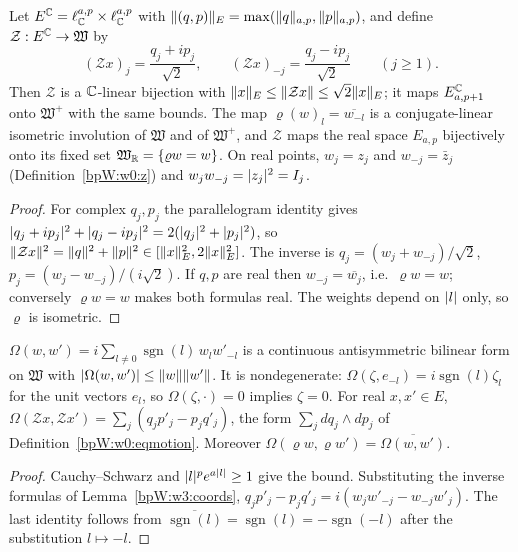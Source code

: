\begin{lemma}\label{bpW:w3:coords}
Let $E^{\mathbb{C}}=\ell^{a,p}_{\mathbb{C}}\times\ell^{a,p}_{\mathbb{C}}$ with $\lVert (q,p)\rVert_E=\max(\lVert q\rVert_{a,p},\lVert p\rVert_{a,p})$, and define
$\mathcal Z:E^{\mathbb{C}}\to\mathfrak W$ by
\[(\mathcal Zx)_j=\frac{q_j+ip_j}{\sqrt2},\qquad(\mathcal Zx)_{-j}=\frac{q_j-ip_j}{\sqrt2}\qquad(j\ge1).\]
Then $\mathcal Z$ is a $\mathbb{C}$-linear bijection with $\lVert x\rVert_E\le\lVert \mathcal Zx\rVert\le\sqrt2\lVert x\rVert_E$; it maps
$E^{\mathbb{C}}_{a,p+1}$ onto $\mathfrak W^+$ with the same bounds. The map $\varrho(w)_l=\overline{w_{-l}}$ is a
conjugate-linear isometric involution of $\mathfrak W$ and of $\mathfrak W^+$, and $\mathcal Z$ maps the real space
$E_{a,p}$ bijectively onto its fixed set $\mathfrak W_{\mathbb{R}}=\{\varrho w=w\}$. On real points, $w_j=z_j$ and
$w_{-j}=\bar z_j$ (Definition~\ref{bpW:w0:z}) and $w_jw_{-j}=\lvert z_j\rvert^2=I_j$.
\end{lemma}

\begin{proof}
For complex $q_j,p_j$ the parallelogram identity gives $\lvert q_j+ip_j\rvert^2+\lvert q_j-ip_j\rvert^2=2(\lvert q_j\rvert^2+\lvert p_j\rvert^2)$,
so $\lVert \mathcal Zx\rVert^2=\lVert q\rVert^2+\lVert p\rVert^2\in[\lVert x\rVert_E^2,2\lVert x\rVert_E^2]$. The inverse is
$q_j=(w_j+w_{-j})/\sqrt2$, $p_j=(w_j-w_{-j})/(i\sqrt2)$. If $q,p$ are real then $w_{-j}=\overline{w_j}$, i.e.\
$\varrho w=w$; conversely $\varrho w=w$ makes both formulas real. The weights depend on $\lvert l\rvert$ only, so $\varrho$ is
isometric.
\end{proof}

\begin{lemma}\label{bpW:w3:omega}
$\Omega(w,w')=i\sum_{l\ne0}\operatorname{sgn}(l)\,w_lw'_{-l}$ is a continuous antisymmetric bilinear form on
$\mathfrak W$ with $\lvert \Omega(w,w')\rvert\le\lVert w\rVert\lVert w'\rVert$. It is nondegenerate: $\Omega(\zeta,e_{-l})=i\operatorname{sgn}(l)\zeta_l$
for the unit vectors $e_l$, so $\Omega(\zeta,\cdot)=0$ implies $\zeta=0$. For real $x,x'\in E$,
$\Omega(\mathcal Zx,\mathcal Zx')=\sum_j(q_jp'_j-p_jq'_j)$, the form $\sum_jdq_j\wedge dp_j$ of
Definition~\ref{bpW:w0:eqmotion}. Moreover $\Omega(\varrho w,\varrho w')=\overline{\Omega(w,w')}$.
\end{lemma}

\begin{proof}
Cauchy--Schwarz and $\lvert l\rvert^{p}e^{a\lvert l\rvert}\ge1$ give the bound. Substituting the inverse formulas of
Lemma~\ref{bpW:w3:coords}, $q_jp'_j-p_jq'_j=i(w_jw'_{-j}-w_{-j}w'_j)$. The last identity follows from
$\overline{\operatorname{sgn}(l)}=\operatorname{sgn}(l)=-\operatorname{sgn}(-l)$ after the substitution $l\mapsto-l$.
\end{proof}

